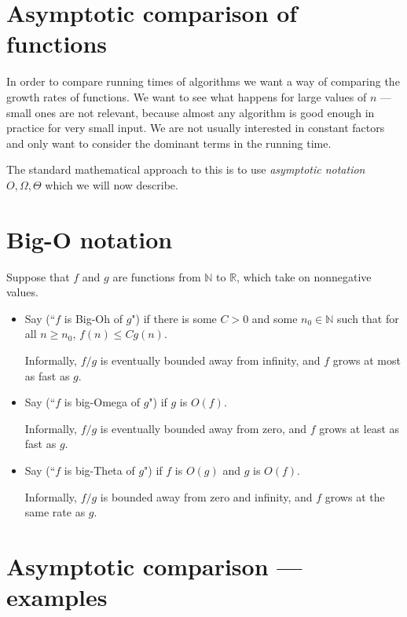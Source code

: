 \section*{Asymptotic comparison of functions}
In order to compare running times of algorithms we want a way of comparing
the growth rates of functions. We want to see what happens for large values of $n$ --- small ones are not
 relevant, because almost any algorithm is good enough in practice for very small input. 
 We are not usually interested in constant factors and only want to consider the 
dominant terms in the running time.

The standard mathematical approach to this is to use \emph{asymptotic notation}
$O, \Omega, \Theta$ which we will now describe.

\section*{Big-O notation}
\begin{Definition}

Suppose that $f$ and $g$ are functions from $\mathbb{N}$ to $\mathbb{R}$, 
which take on nonnegative values. 
\begin{itemize}
\item Say  (``$f$ is Big-Oh of $g$") if there is
some $C > 0$ and some $n_0 \in \mathbb{N}$ such that for all $n \geq
n_0$, $f(n) \leq C g(n)$. 

Informally, $f/g$ is eventually bounded away from infinity, and $f$ grows at most as fast as $g$.

\item Say  (``$f$ is big-Omega of $g$") if $g$ is
$O(f)$. 

Informally, $f/g$ is eventually bounded away from zero, and $f$ grows at least as fast as $g$.
\item Say  (``$f$ is big-Theta of $g$") if $f$ is 
$O(g)$ and $g$ is $O(f)$. 

Informally, $f/g$ is bounded away from zero and infinity, and $f$ grows at the same rate as $g$.
\end{itemize}
\end{Definition}



\section*{Asymptotic comparison --- examples}

